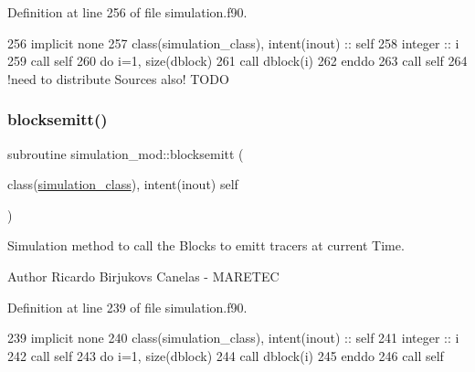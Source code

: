 Definition at line 256 of file simulation.\+f90.


\begin{DoxyCode}
256     \textcolor{keywordtype}{implicit none}
257     \textcolor{keywordtype}{class}(simulation\_class), \textcolor{keywordtype}{intent(inout)} :: self
258     \textcolor{keywordtype}{integer} :: i
259     \textcolor{keyword}{call }self%
260     \textcolor{keywordflow}{do} i=1, \textcolor{keyword}{size}(dblock)
261         \textcolor{keyword}{call }dblock(i)%
262 \textcolor{keywordflow}{    enddo}
263     \textcolor{keyword}{call }self%
264     \textcolor{comment}{!need to distribute Sources also! TODO}
\end{DoxyCode}
\mbox{\label{namespacesimulation__mod_a13aa0745f4601e3f418143dab2f18276}} 
\subsubsection{\texorpdfstring{blocksemitt()}{blocksemitt()}}
{\footnotesize\ttfamily subroutine simulation\+\_\+mod\+::blocksemitt (\begin{DoxyParamCaption}\item[{class(\mbox{\hyperlink{structsimulation__mod_1_1simulation__class}{simulation\+\_\+class}}), intent(inout)}]{self }\end{DoxyParamCaption})\hspace{0.3cm}{\ttfamily [private]}}



Simulation method to call the Blocks to emitt tracers at current Time. 

\begin{DoxyAuthor}{Author}
Ricardo Birjukovs Canelas -\/ M\+A\+R\+E\+T\+EC 
\end{DoxyAuthor}


Definition at line 239 of file simulation.\+f90.


\begin{DoxyCode}
239     \textcolor{keywordtype}{implicit none}
240     \textcolor{keywordtype}{class}(simulation\_class), \textcolor{keywordtype}{intent(inout)} :: self
241     \textcolor{keywordtype}{integer} :: i
242     \textcolor{keyword}{call }self%
243     \textcolor{keywordflow}{do} i=1, \textcolor{keyword}{size}(dblock)
244         \textcolor{keyword}{call }dblock(i)%
245 \textcolor{keywordflow}{    enddo}
246     \textcolor{keyword}{call }self%
\end{DoxyCode}
\mbox{\label{namespacesimulation__mod_ab2e7a1b0f131ab6fe40454d32cb3e24f}} 
